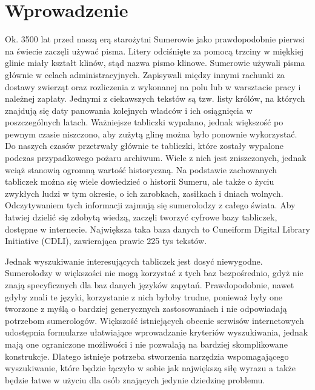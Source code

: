 \chapter*{Wprowadzenie}


Ok. 3500 lat przed naszą erą starożytni Sumerowie jako prawdopodobnie pierwsi na świecie zaczęli używać pisma. Litery odciśnięte za pomocą trzciny w miękkiej glinie miały kształt klinów, stąd nazwa pismo klinowe. Sumerowie używali pisma głównie w celach administracyjnych. Zapisywali między innymi rachunki za dostawy zwierząt oraz rozliczenia z wykonanej na polu lub w warsztacie pracy i należnej zapłaty. Jednymi z ciekawszych tekstów są tzw. listy królów, na których znajdują się daty panowania kolejnych władców i ich osiągnięcia w poszczególnych latach. 
Ważniejsze tabliczki wypalano, jednak większość po pewnym czasie niszczono, aby zużytą glinę można było ponownie wykorzystać. Do naszych czasów przetrwały głównie te tabliczki, które zostały wypalone podczas przypadkowego pożaru archiwum. Wiele z nich jest zniszczonych, jednak wciąż stanowią ogromną wartość historyczną. 
Na podstawie zachowanych tabliczek można się wiele dowiedzieć o historii Sumeru, ale także o życiu zwykłych ludzi w tym okresie, o ich zarobkach, zasiłkach i dniach wolnych. Odczytywaniem tych informacji zajmują się sumerolodzy z całego świata. Aby łatwiej dzielić się zdobytą wiedzą, zaczęli tworzyć cyfrowe bazy tabliczek, dostępne w internecie. Największa taka baza danych to Cuneiform Digital Library Initiative (CDLI), zawierająca prawie 225 tys tekstów.

Jednak wyszukiwanie interesujących tabliczek jest dosyć niewygodne. 
Sumerolodzy w większości nie mogą korzystać z tych baz bezpośrednio, gdyż nie znają specyficznych dla baz danych języków zapytań. Prawdopodobnie, nawet gdyby znali te języki, korzystanie z nich byłoby trudne, ponieważ były one tworzone z myślą o bardziej generycznych zastosowaniach i nie odpowiadają potrzebom sumerologów. 
Większość istniejących obecnie serwisów internetowych udostępnia formularze ułatwiające wprowadzanie kryteriów wyszukiwania, jednak mają one ograniczone możliwości i nie pozwalają na bardziej skomplikowane konstrukcje. Dlatego istnieje potrzeba stworzenia narzędzia wspomagającego wyszukiwanie, które będzie łączyło w sobie jak największą siłę wyrazu a także będzie łatwe w użyciu dla osób znających jedynie dziedzinę problemu.


